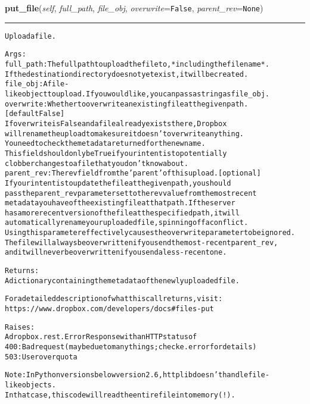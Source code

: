     \label{lib:dropbox:DropboxClient:put_file}

    \vspace{0.5ex}

\hspace{.8\funcindent}\begin{boxedminipage}{\funcwidth}

    \raggedright \textbf{put\_file}(\textit{self}, \textit{full\_path}, \textit{file\_obj}, \textit{overwrite}={\tt False}, \textit{parent\_rev}={\tt None})

    \vspace{-1.5ex}

    \rule{\textwidth}{0.5\fboxrule}
\setlength{\parskip}{2ex}
\begin{alltt}
Upload a file.

Args:
    full\_path: The full path to upload the file to, *including the file name*.
        If the destination directory does not yet exist, it will be created.
    file\_obj: A file-like object to upload. If you would like, you can pass a string as file\_obj.
    overwrite: Whether to overwrite an existing file at the given path. [default False]
        If overwrite is False and a file already exists there, Dropbox
        will rename the upload to make sure it doesn't overwrite anything.
        You need to check the metadata returned for the new name.
        This field should only be True if your intent is to potentially
        clobber changes to a file that you don't know about.
    parent\_rev: The rev field from the 'parent' of this upload. [optional]
        If your intent is to update the file at the given path, you should
        pass the parent\_rev parameter set to the rev value from the most recent
        metadata you have of the existing file at that path. If the server
        has a more recent version of the file at the specified path, it will
        automatically rename your uploaded file, spinning off a conflict.
        Using this parameter effectively causes the overwrite parameter to be ignored.
        The file will always be overwritten if you send the most-recent parent\_rev,
        and it will never be overwritten if you send a less-recent one.

Returns:
    A dictionary containing the metadata of the newly uploaded file.

    For a detailed description of what this call returns, visit:
    https://www.dropbox.com/developers/docs\#files-put

Raises:
    A dropbox.rest.ErrorResponse with an HTTP status of
       400: Bad request (may be due to many things; check e.error for details)
       503: User over quota

Note: In Python versions below version 2.6, httplib doesn't handle file-like objects.
    In that case, this code will read the entire file into memory (!).
\end{alltt}

\setlength{\parskip}{1ex}
    \end{boxedminipage}


